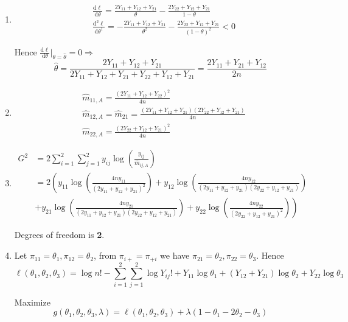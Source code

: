 \documentclass{article}
\begin{document}
\begin{enumerate}[leftmargin = 0 em, label = \arabic*., font = \bfseries]
\begin{enumerate}
		\item 
		\begin{align*}
		&\frac{\mathrm{d}\ell}{\mathrm{d}\theta} = \frac{2 Y_{11} + Y_{12} + Y_{21}}{\theta} - \frac{2 Y_{22} + Y_{12} + Y_{21}}{1-\theta}\\
		&\frac{\mathrm{d}^2 \ell}{\mathrm{d}\theta^1} = -\frac{2 Y_{11} + Y_{12} + Y_{21}}{\theta^2} - \frac{2 Y_{22} + Y_{12} + Y_{21}}{(1 -\theta)^2}	< 0
		\end{align*}

		Hence $\frac{\mathrm{d}\ell}{\mathrm{d}\theta}|_{\theta = \hat{\theta}} = 0 \Rightarrow$
		\[\hat{\theta} = \frac{2Y_{11} + Y_{12} + Y_{21}}{2 Y_{11} +Y_{12} + Y_{21} + Y_{22} + Y_{12} + Y_{21}} = \frac{2Y_{11} + Y_{21} + Y_{12}}{2n}\]

		\item 
		\begin{align*}
		& \hat{m}_{11, A} = \frac{(2Y_{11} + Y_{12} + Y_{22})^2}{4n}\\
		& \hat{m}_{12, A} = \hat{m}_{21} = \frac{(2Y_{11}+ Y_{12} + Y_{21})(2Y_{22} + Y_{12} + Y_{21})}{4n}\\
		& \hat{m}_{22, A} = \frac{(2Y_{22} + Y_{12} + Y_{21})^2}{4n}
		\end{align*}

		\item 
		\begin{align*}
		G^2 & = 2 \sum_{i = 1}^2 \sum_{j=1}^2 y_{ij} \log \left(\frac{y_{ij}}{\hat{m}_{ij, A}}\right)\\
		& = 2 \left( y_{11} \log\left(\frac{4 n y_{11}}{(2y_{11} + y_{12} + y_{21})^2 }\right) + y_{12} \log\left(\frac{4 n y_{12}}{(2y_{11} + y_{12} + y_{21})(2 y_{22} + y_{12} + y_{21}) }\right) \right.\\
		&\left. + y_{21} \log\left(\frac{4 n y_{21}}{(2y_{11} + y_{12} + y_{21})(2 y_{22} + y_{12} + y_{21}) }\right) + y_{22} \log\left(\frac{4 n y_{22}}{(2 y_{22} + y_{12} + y_{21})^2}\right)\right)	
		\end{align*}

		Degrees of freedom is \textbf{2}. 


		\item 
		Let $\pi_{11} = \theta_1, \pi_{12} = \theta_2 $, from $\pi_{i+} = \pi_{+i}$ we have $\pi_{21} = \theta_2, \pi_{22} = \theta_3$. Hence 
		\[\ell(\theta_1 , \theta_2, \theta_3) = \log n! - \sum_{i =1}^2 \sum_{j=1}^2 \log Y_{ij}! + Y_{11} \log \theta_1 + (Y_{12} + Y_{21}) \log \theta_2 + Y_{22} \log \theta_3 \]

		Maximize
		\[g(\theta_1 , \theta_2, \theta_3, \lambda) = \ell(\theta_1, \theta_2, \theta_3) + \lambda(1 - \theta_1 - 2\theta_2 - \theta_3)\]


\end{enumerate}
\end{enumerate}
\end{document}
